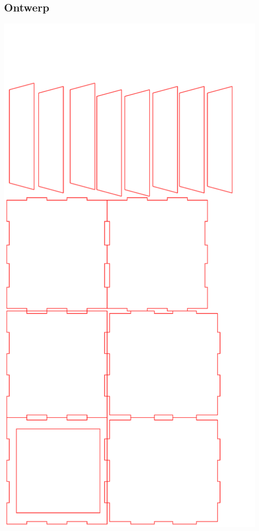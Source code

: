 \subsection{Ontwerp}
\begin{center}
\includegraphics[height=0.9\textheight, angle = 0]{src/ontwerp/Liftkooi.pdf}
\end{center}
